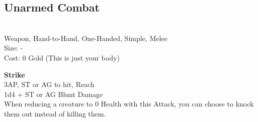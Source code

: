 \subsection{Unarmed Combat}\label{weapon:unarmedCombat}\\
Weapon, Hand-to-Hand, One-Handed, Simple, Melee\\
Size: -\\
Cost: 0 Gold (This is just your body)

\textbf{Strike}\\
3AP, ST or AG to hit,  Reach\\
1d4 +  ST or AG Blunt Damage\\
When reducing a creature to 0 Health with this Attack, you can choose to knock them out instead of killing them.
